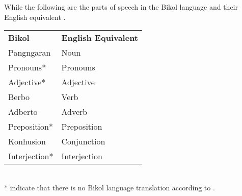 While the following are the parts of speech in the Bikol language and their English equivalent \cite{bikol_dictionary}.

\begin{center} \begin{tabular}{ll} 
    \textbf{Bikol} & \textbf{English Equivalent} 
    \\ Pangngaran & Noun 
    \\ Pronouns* & Pronouns 
    \\ Adjective* & Adjective 
    \\ Berbo & Verb 
    \\ Adberto & Adverb 
    \\ Preposition* & Preposition 
    \\ Konhusion & Conjunction 
    \\ Interjection* & Interjection 
    \end{tabular} 
    \\
    * indicate that there is no Bikol language translation according to \cite{bikol_dictionary}.
\end{center}